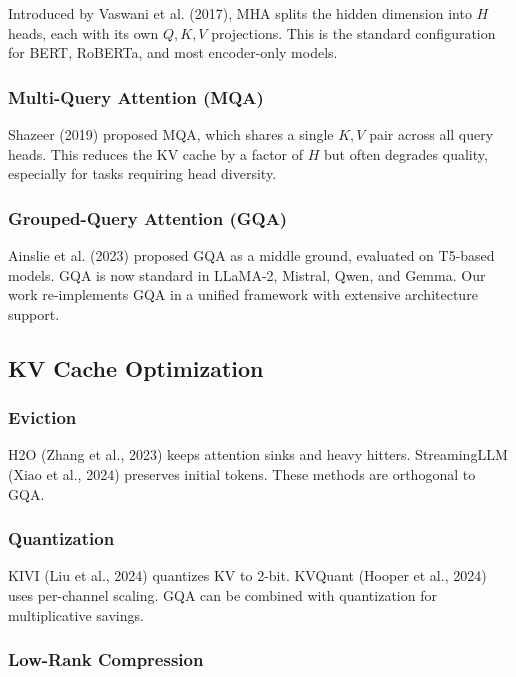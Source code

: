 Introduced by Vaswani et al. (2017), MHA splits the hidden dimension into 
$H$ heads, each with its own $Q, K, V$ projections. This is the standard 
configuration for BERT, RoBERTa, and most encoder-only models.

\subsubsection{Multi-Query Attention (MQA)}

Shazeer (2019) proposed MQA, which shares a single $K, V$ pair across all 
query heads. This reduces the KV cache by a factor of $H$ but often 
degrades quality, especially for tasks requiring head diversity.

\subsubsection{Grouped-Query Attention (GQA)}

Ainslie et al. (2023) proposed GQA as a middle ground, evaluated on 
T5-based models. GQA is now standard in LLaMA-2, Mistral, Qwen, and 
Gemma. Our work re-implements GQA in a unified framework with extensive 
architecture support.

\subsection{KV Cache Optimization}

\subsubsection{Eviction}

H2O (Zhang et al., 2023) keeps attention sinks and heavy hitters. 
StreamingLLM (Xiao et al., 2024) preserves initial tokens. These methods 
are orthogonal to GQA.

\subsubsection{Quantization}

KIVI (Liu et al., 2024) quantizes KV to 2-bit. KVQuant (Hooper et al., 2024) 
uses per-channel scaling. GQA can be combined with quantization for 
multiplicative savings.

\subsubsection{Low-Rank Compression}

